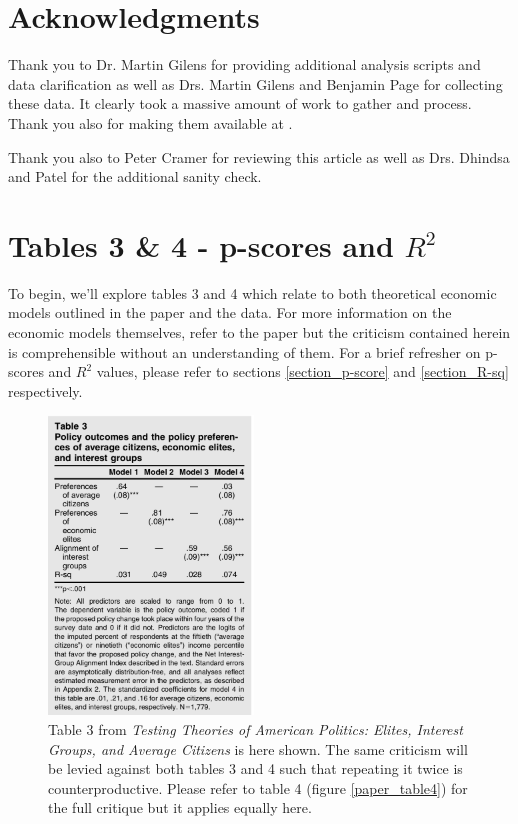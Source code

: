 \documentclass[]{article}
\begin{document}
\section{Acknowledgments}
Thank you to Dr. Martin Gilens for providing additional analysis scripts and data clarification as well as Drs. Martin Gilens and Benjamin Page for collecting these data. 
It clearly took a massive amount of work to gather and process.
Thank you also for making them available at \cite{gilens}.

Thank you also to Peter Cramer for reviewing this article as well as Drs. Dhindsa and Patel for the additional sanity check.

\newpage
\section{Tables 3 \& 4 - p-scores and $R^2$}
To begin, we'll explore tables 3 and 4 which relate to both theoretical economic models outlined in the paper and the data.
For more information on the economic models themselves, refer to the paper but the criticism contained herein is comprehensible without an understanding of them.
For a brief refresher on p-scores and $R^2$ values, please refer to sections \ref{section_p-score} and \ref{section_R-sq} respectively.

\begin{figure}[H]
	\begin{center}
		\includegraphics[height=300px]{./figures/paper/economic-table3.png}
	\end{center}	
	\caption{Table 3 from \textit{Testing Theories of American Politics: Elites, Interest Groups, and Average Citizens} is here shown. The same criticism will be levied against both tables 3 and 4 such that repeating it twice is counterproductive. Please refer to table 4 (figure \ref{paper_table4}) for the full critique but it applies equally here.}
	\label{paper_table3}
\end{figure}
\end{document}
